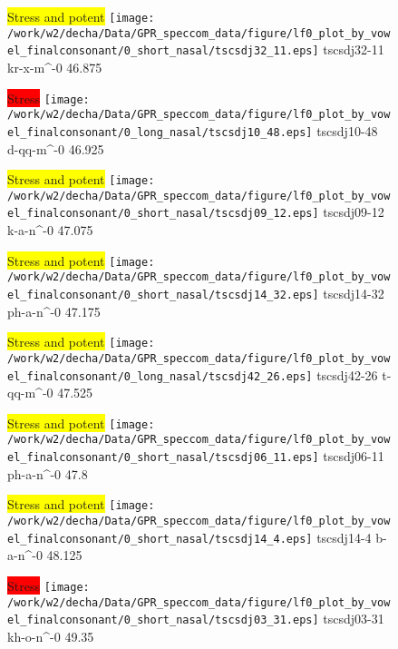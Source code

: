 \documentclass{article}
\begin{document}
\begin{figure}[t]
\begin{minipage}[b]{.24\textwidth}
\colorbox{yellow}{Stress and potent}
\centering
\texttt{[image: /work/w2/decha/Data/GPR\_speccom\_data/figure/lf0\_plot\_by\_vowel\_finalconsonant/0\_short\_nasal/tscsdj32\_11.eps]}
tscsdj32-11 kr-x-m\textasciicircum-0 46.875
\end{minipage}
\begin{minipage}[b]{.24\textwidth}
\colorbox{red}{Stress}
\centering
\texttt{[image: /work/w2/decha/Data/GPR\_speccom\_data/figure/lf0\_plot\_by\_vowel\_finalconsonant/0\_long\_nasal/tscsdj10\_48.eps]}
tscsdj10-48 d-qq-m\textasciicircum-0 46.925
\end{minipage}
\begin{minipage}[b]{.24\textwidth}
\colorbox{yellow}{Stress and potent}
\centering
\texttt{[image: /work/w2/decha/Data/GPR\_speccom\_data/figure/lf0\_plot\_by\_vowel\_finalconsonant/0\_short\_nasal/tscsdj09\_12.eps]}
tscsdj09-12 k-a-n\textasciicircum-0 47.075
\end{minipage}
\begin{minipage}[b]{.24\textwidth}
\colorbox{yellow}{Stress and potent}
\centering
\texttt{[image: /work/w2/decha/Data/GPR\_speccom\_data/figure/lf0\_plot\_by\_vowel\_finalconsonant/0\_short\_nasal/tscsdj14\_32.eps]}
tscsdj14-32 ph-a-n\textasciicircum-0 47.175
\end{minipage}
\end{figure}
\clearpage
\begin{figure}[t]
\begin{minipage}[b]{.24\textwidth}
\colorbox{yellow}{Stress and potent}
\centering
\texttt{[image: /work/w2/decha/Data/GPR\_speccom\_data/figure/lf0\_plot\_by\_vowel\_finalconsonant/0\_long\_nasal/tscsdj42\_26.eps]}
tscsdj42-26 t-qq-m\textasciicircum-0 47.525
\end{minipage}
\begin{minipage}[b]{.24\textwidth}
\colorbox{yellow}{Stress and potent}
\centering
\texttt{[image: /work/w2/decha/Data/GPR\_speccom\_data/figure/lf0\_plot\_by\_vowel\_finalconsonant/0\_short\_nasal/tscsdj06\_11.eps]}
tscsdj06-11 ph-a-n\textasciicircum-0 47.8
\end{minipage}
\begin{minipage}[b]{.24\textwidth}
\colorbox{yellow}{Stress and potent}
\centering
\texttt{[image: /work/w2/decha/Data/GPR\_speccom\_data/figure/lf0\_plot\_by\_vowel\_finalconsonant/0\_short\_nasal/tscsdj14\_4.eps]}
tscsdj14-4 b-a-n\textasciicircum-0 48.125
\end{minipage}
\begin{minipage}[b]{.24\textwidth}
\colorbox{red}{Stress}
\centering
\texttt{[image: /work/w2/decha/Data/GPR\_speccom\_data/figure/lf0\_plot\_by\_vowel\_finalconsonant/0\_short\_nasal/tscsdj03\_31.eps]}
tscsdj03-31 kh-o-n\textasciicircum-0 49.35
\end{minipage}
\end{figure}
\end{document}
